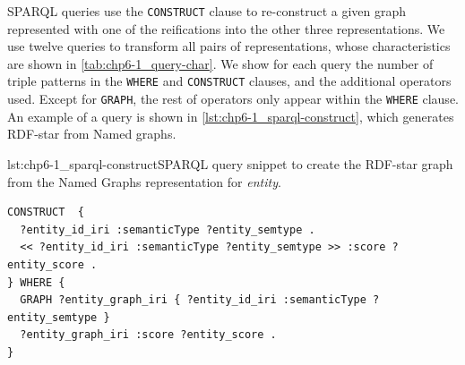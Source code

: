SPARQL queries use the \texttt{CONSTRUCT} clause to re-construct a given graph represented with one of the reifications into the other three representations. We use twelve queries to transform all pairs of representations, whose characteristics are shown in \cref{tab:chp6-1_query-char}. We show for each query the number of triple patterns in the \texttt{WHERE} and \texttt{CONSTRUCT} clauses, and the additional operators used. Except for \texttt{GRAPH}, the rest of operators only appear within the \texttt{WHERE} clause. An example of a query is shown in \cref{lst:chp6-1_sparql-construct}, which generates RDF-star from Named graphs.


\noindent\begin{captionedlisting}{lst:chp6-1_sparql-construct}{SPARQL query snippet to create the RDF-star graph from the Named Graphs representation for \textit{entity}. }
\centering
{
\begin{lstlisting}[basicstyle=\ttfamily\small,label={list:example1},columns=flexible,language=sparql]
CONSTRUCT  {
  ?entity_id_iri :semanticType ?entity_semtype .
  << ?entity_id_iri :semanticType ?entity_semtype >> :score ?entity_score .
} WHERE {
  GRAPH ?entity_graph_iri { ?entity_id_iri :semanticType ?entity_semtype }
  ?entity_graph_iri :score ?entity_score . 
}
\end{lstlisting}
}
\end{captionedlisting}



